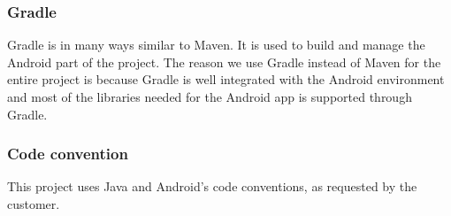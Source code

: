 \subsubsection{Gradle}
Gradle is in many ways similar to Maven. It is used to build and manage the Android part of the project. The reason we use Gradle instead of Maven for the entire project is because Gradle is well integrated with the Android environment and most of the libraries needed for the Android app is supported through Gradle.

\subsubsection{Code convention}
This project uses Java and Android's code conventions, as requested by the customer.
